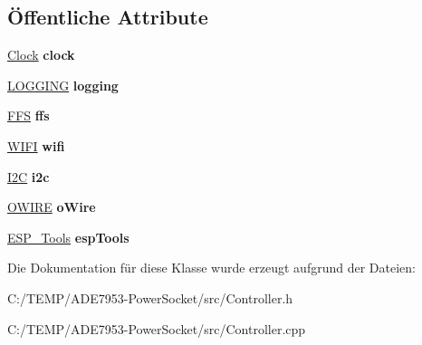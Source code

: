 \subsection*{Öffentliche Attribute}
\begin{DoxyCompactItemize}
\item 
\mbox{\label{class_controller_a55147b5c14f76de55eb646d25ccb746f}} 
\hyperlink{class_clock}{Clock} {\bfseries clock}
\item 
\mbox{\label{class_controller_ad7e78721b65f5ed9000e090e818cf842}} 
\hyperlink{class_l_o_g_g_i_n_g}{L\+O\+G\+G\+I\+NG} {\bfseries logging}
\item 
\mbox{\label{class_controller_a01b1677a2b304ddd3adb7410a18490f8}} 
\hyperlink{class_f_f_s}{F\+FS} {\bfseries ffs}
\item 
\mbox{\label{class_controller_a53536b2aadd851baf07052b861b5067d}} 
\hyperlink{class_w_i_f_i}{W\+I\+FI} {\bfseries wifi}
\item 
\mbox{\label{class_controller_a52b5973eba6bacfcc2529559065b5415}} 
\hyperlink{class_i2_c}{I2C} {\bfseries i2c}
\item 
\mbox{\label{class_controller_a10065bc74597d961faef1dbece078862}} 
\hyperlink{class_o_w_i_r_e}{O\+W\+I\+RE} {\bfseries o\+Wire}
\item 
\mbox{\label{class_controller_ae9e79871b8732041da577b81ce165ecf}} 
\hyperlink{class_e_s_p___tools}{E\+S\+P\+\_\+\+Tools} {\bfseries esp\+Tools}
\end{DoxyCompactItemize}


Die Dokumentation für diese Klasse wurde erzeugt aufgrund der Dateien\+:\begin{DoxyCompactItemize}
\item 
C\+:/\+T\+E\+M\+P/\+A\+D\+E7953-\/\+Power\+Socket/src/Controller.\+h\item 
C\+:/\+T\+E\+M\+P/\+A\+D\+E7953-\/\+Power\+Socket/src/Controller.\+cpp\end{DoxyCompactItemize}

